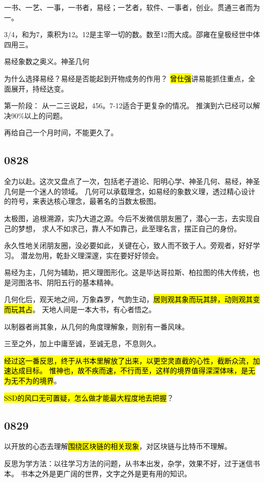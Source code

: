 一书、一艺、一事，一书者，易经；一艺者，软件、一事者，创业。贯通三者而为一。

3/4，和为7，乘积为12。12是主宰一切的数。数至12而大成。邵雍在皇极经世中体四用三。

易经象数之奥义。神圣几何

为什么选择易经？易经是否能起到开物成务的作用？
\hl{曾仕强}讲易能抓住重点，全面展开，持经达变。

第一阶段： 从一二三说起，456。7-12适合于更复杂的情况。
推演到六已经可以解决90\%以上的问题。

再给自己一个月时间，不能更久了。

\subsection{0828}

全力以赴。这次又盘点了一次，包括老子道论、阳明心学、神圣几何、易经，神圣几何是一个迷人的领域。
几何可以承载理念，如易经的象数义理，透过精心设计的符号，来表达核心理念，最著名的当数太极图。

太极图，追根溯源，实乃大道之源。今后不发微信朋友圈了，潜心一志，去实现自己的梦想，
求人不如求己，靠人不如靠己，此至理名言，摆正自己的身份。

永久性地关闭朋友圈，没必要如此，关键在心，致人而不致于人。旁观者，好好学习。
潜龙勿用，乾卦义理深邃，实在要好好领会。

易经为主，几何为辅助，把义理图形化。这是毕达哥拉斯、柏拉图的伟大传统，也是河图洛书、阴阳五行的基本精神。

几何化后，观天地之间，万象森罗，气韵生动，\hl{居则观其象而玩其辞，动则观其变而玩其占}。
天地人间是一本大书，有心者悟之。

以制器者尚其象，从几何的角度理解象，则别有一番风味。

三至之外，加上中庸至诚，至诚无息，不息则久。

\hl{经过这一番反思，终于从书本里解放了出来，以更空灵直截的心性，截断众流，加速达成目标。
惟神也，故不疾而速，不行而至，这样的境界值得深深体味，是无为无不为的境界}。

\hl{SSD的风口无可置疑，怎么做才能最大程度地去把握}？

\subsection{0829}

以开放的心态去理解\hl{围绕区块链的相关现象}，对区块链与比特币不理解。

反思为学方法：以往学习方法的问题，从书本出发，杂学，效果不好，过于迷信书本。
书本之外是更广阔的世界，文字之外是更有用的知识。


